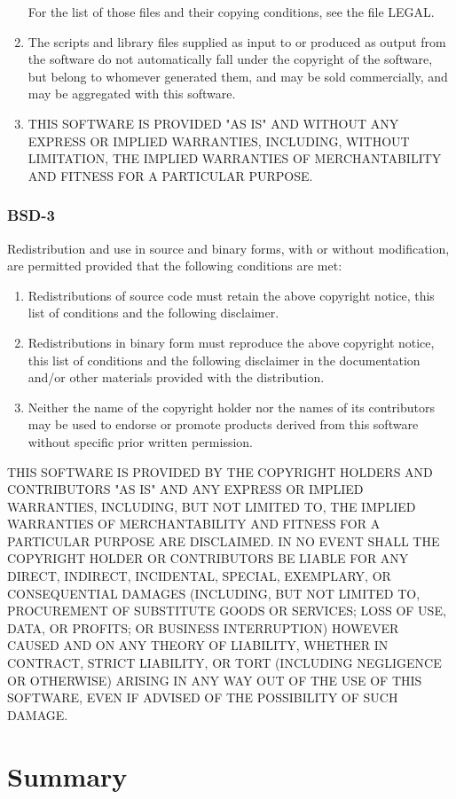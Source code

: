 \documentclass[11pt,a4paper, twoside]{article}
\begin{document}
\begin{enumerate}
     For the list of those files and their copying conditions, see the
     file LEGAL.
\item The scripts and library files supplied as input to or produced as 
     output from the software do not automatically fall under the
     copyright of the software, but belong to whomever generated them, 
     and may be sold commercially, and may be aggregated with this
     software.
\item THIS SOFTWARE IS PROVIDED "AS IS" AND WITHOUT ANY EXPRESS OR
     IMPLIED WARRANTIES, INCLUDING, WITHOUT LIMITATION, THE IMPLIED
     WARRANTIES OF MERCHANTABILITY AND FITNESS FOR A PARTICULAR
     PURPOSE.
\end{enumerate}
\subsubsection{BSD-3}
Redistribution and use in source and binary forms, with or without modification, are permitted provided that the following conditions are met:
\begin{enumerate}

\item Redistributions of source code must retain the above copyright notice, this list of conditions and the following disclaimer.

\item Redistributions in binary form must reproduce the above copyright notice, this list of conditions and the following disclaimer in the documentation and/or other materials provided with the distribution.

\item Neither the name of the copyright holder nor the names of its contributors may be used to endorse or promote products derived from this software without specific prior written permission.

\end{enumerate}
THIS SOFTWARE IS PROVIDED BY THE COPYRIGHT HOLDERS AND CONTRIBUTORS "AS IS" AND ANY EXPRESS OR IMPLIED WARRANTIES, INCLUDING, BUT NOT LIMITED TO, THE IMPLIED WARRANTIES OF MERCHANTABILITY AND FITNESS FOR A PARTICULAR PURPOSE ARE DISCLAIMED. IN NO EVENT SHALL THE COPYRIGHT HOLDER OR CONTRIBUTORS BE LIABLE FOR ANY DIRECT, INDIRECT, INCIDENTAL, SPECIAL, EXEMPLARY, OR CONSEQUENTIAL DAMAGES (INCLUDING, BUT NOT LIMITED TO, PROCUREMENT OF SUBSTITUTE GOODS OR SERVICES; LOSS OF USE, DATA, OR PROFITS; OR BUSINESS INTERRUPTION) HOWEVER CAUSED AND ON ANY THEORY OF LIABILITY, WHETHER IN CONTRACT, STRICT LIABILITY, OR TORT (INCLUDING NEGLIGENCE OR OTHERWISE) ARISING IN ANY WAY OUT OF THE USE OF THIS SOFTWARE, EVEN IF ADVISED OF THE POSSIBILITY OF SUCH DAMAGE.
\newpage
\section{Summary}
\end{document}
